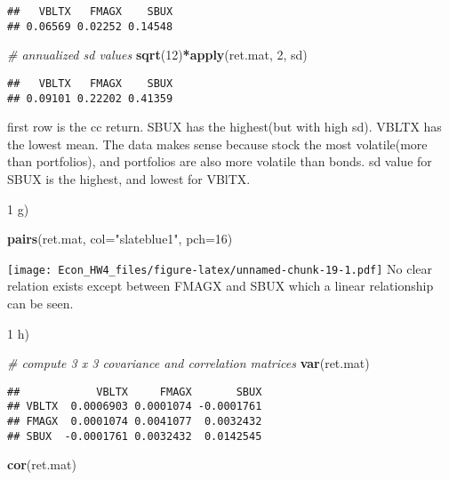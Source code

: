 \documentclass[]{article}
\newenvironment{Shaded}{\begin{snugshade}}{\end{snugshade}}
\newcommand{\KeywordTok}[1]{\textcolor[rgb]{0.13,0.29,0.53}{\textbf{#1}}}
\newcommand{\DataTypeTok}[1]{\textcolor[rgb]{0.13,0.29,0.53}{#1}}
\newcommand{\DecValTok}[1]{\textcolor[rgb]{0.00,0.00,0.81}{#1}}
\newcommand{\StringTok}[1]{\textcolor[rgb]{0.31,0.60,0.02}{#1}}
\newcommand{\CommentTok}[1]{\textcolor[rgb]{0.56,0.35,0.01}{\textit{#1}}}
\newcommand{\OperatorTok}[1]{\textcolor[rgb]{0.81,0.36,0.00}{\textbf{#1}}}
\newcommand{\NormalTok}[1]{#1}
\begin{document}
\begin{verbatim}
##   VBLTX   FMAGX    SBUX 
## 0.06569 0.02252 0.14548
\end{verbatim}

\begin{Shaded}
\begin{Highlighting}[]
\CommentTok{# annualized sd values}
\KeywordTok{sqrt}\NormalTok{(}\DecValTok{12}\NormalTok{)}\OperatorTok{*}\KeywordTok{apply}\NormalTok{(ret.mat, }\DecValTok{2}\NormalTok{, sd)}
\end{Highlighting}
\end{Shaded}

\begin{verbatim}
##   VBLTX   FMAGX    SBUX 
## 0.09101 0.22202 0.41359
\end{verbatim}

first row is the cc return. SBUX has the highest(but with high sd).
VBLTX has the lowest mean. The data makes sense because stock the most
volatile(more than portfolios), and portfolios are also more volatile
than bonds. sd value for SBUX is the highest, and lowest for VBlTX.

1 g)

\begin{Shaded}
\begin{Highlighting}[]
\KeywordTok{pairs}\NormalTok{(ret.mat, }\DataTypeTok{col=}\StringTok{"slateblue1"}\NormalTok{, }\DataTypeTok{pch=}\DecValTok{16}\NormalTok{)}
\end{Highlighting}
\end{Shaded}

\texttt{[image: Econ\_HW4\_files/figure-latex/unnamed-chunk-19-1.pdf]} No
clear relation exists except between FMAGX and SBUX which a linear
relationship can be seen.

1 h)

\begin{Shaded}
\begin{Highlighting}[]
\CommentTok{# compute 3 x 3 covariance and correlation matrices}
\KeywordTok{var}\NormalTok{(ret.mat)}
\end{Highlighting}
\end{Shaded}

\begin{verbatim}
##            VBLTX     FMAGX       SBUX
## VBLTX  0.0006903 0.0001074 -0.0001761
## FMAGX  0.0001074 0.0041077  0.0032432
## SBUX  -0.0001761 0.0032432  0.0142545
\end{verbatim}

\begin{Shaded}
\begin{Highlighting}[]
\KeywordTok{cor}\NormalTok{(ret.mat)}
\end{Highlighting}
\end{Shaded}
\end{document}
